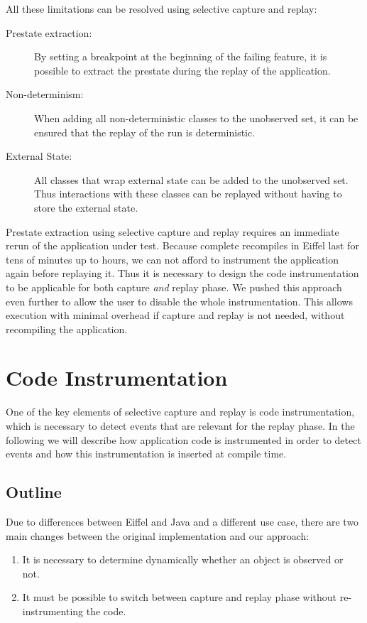 All these limitations can be resolved using selective capture and replay:
\begin{description}
\item [Prestate extraction:] By setting a breakpoint at the beginning of the failing feature, it is possible to extract the prestate during the replay of the application.
\item [Non-determinism:] When adding all non-deterministic classes to the unobserved set, it can be ensured that the replay of the run is deterministic.
\item [External State:] All classes that wrap external state can be added to the unobserved set. Thus interactions with these classes can be replayed without having to store the external state.
\end{description}

Prestate extraction using selective capture and replay requires an immediate rerun of the application under test. Because complete recompiles in Eiffel last for tens of minutes up to hours, we can not afford to instrument the application again before replaying it. Thus it is necessary to design the code instrumentation to be applicable for both capture \emph{and} replay phase. We pushed this approach even further to allow the user to disable the whole instrumentation. This allows execution with minimal overhead if capture and replay is not needed, without recompiling the application.

\section{Code Instrumentation}
One of the key elements of selective capture and replay is code instrumentation, which is necessary to detect events that are relevant for the replay phase. In the following we will describe how application code is instrumented in order to detect events and how this instrumentation is inserted at compile time.

\subsection{Outline}
Due to differences between Eiffel and Java and a different use case, there are two main changes between the original implementation and our approach:

\begin{enumerate}
 \item It is necessary to determine dynamically whether an object is observed or not.
\item It must be possible to switch between capture and replay phase without re-instrumenting the code.
\end{enumerate}

